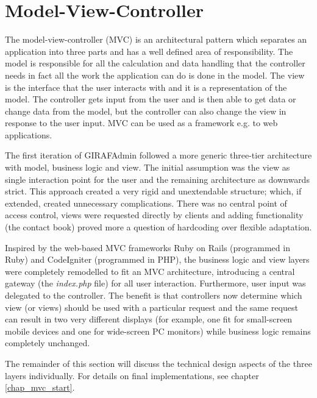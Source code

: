 \section{Model-View-Controller}
The model-view-controller (MVC) is an architectural pattern which separates an application into three parts and has a well defined area of responsibility. The model is responsible for all the calculation and data handling that the controller needs in fact all the work the application can do is done in the model. The view is the interface that the user interacts with and it is a representation of the model. The controller gets input from the user and is then able to get data or change data from the model, but the controller can also change the view in response to the user input\cite{vmc}. MVC can be used as a framework e.g. to web applications.

The first iteration of GIRAFAdmin followed a more generic three-tier architecture with model, business logic and view. The initial assumption was the view as single interaction point for the user and the remaining architecture as downwards strict. This approach created a very rigid and unextendable structure; which, if extended, created unnecessary complications. There was no central point of access control, views were requested directly by clients and adding functionality (the contact book) proved more a question of hardcoding over flexible adaptation.

Inspired by the web-based MVC frameworks Ruby on Rails (programmed in Ruby) and CodeIgniter (programmed in PHP), the business logic and view layers were completely remodelled to fit an MVC architecture, introducing a central gateway (the \emph{index.php} file) for all user interaction. Furthermore, user input was delegated to the controller. The benefit is that controllers now determine which view (or views) should be used with a particular request and the same request can result in two very different displays (for example, one fit for small-screen mobile devices and one for wide-screen PC monitors) while business logic remains completely unchanged.

The remainder of this section will discuss the technical design aspects of the three layers individually. For details on final implementations, see chapter \vref{chap_mvc_start}.


